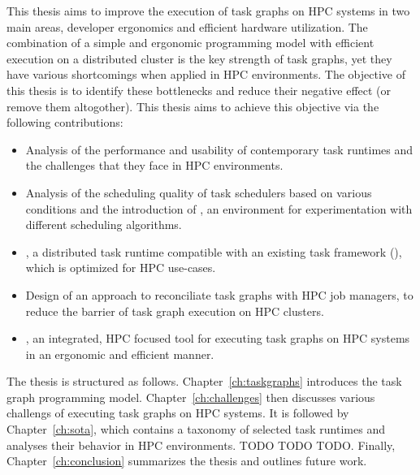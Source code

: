 This thesis aims to improve the execution of task graphs on HPC systems in two main areas,
developer ergonomics and efficient hardware utilization. The combination of a simple and ergonomic
programming model with efficient execution on a distributed cluster is the key strength of task
graphs, yet they have various shortcomings when applied in HPC environments. The objective of this
thesis is to identify these bottlenecks and reduce their negative effect (or remove them
altogother). This thesis aims to achieve this objective via the following contributions:
\begin{itemize}
	\item Analysis of the performance and usability of contemporary task runtimes and the challenges that
	      they face in HPC environments.
	\item Analysis of the scheduling quality of task schedulers based on various conditions and the
	      introduction of \estee{}, an environment for experimentation with different scheduling
	      algorithms.
	\item \rsds{}, a distributed task runtime compatible with an existing task framework
	      (\dask{}), which is optimized for HPC use-cases.
	\item Design of an approach to reconciliate task graphs with HPC job managers, to reduce the barrier of
	      task graph execution on HPC clusters.
	\item \hyperqueue{}, an integrated, HPC focused tool for executing task graphs on HPC systems
	      in an ergonomic and efficient manner.
\end{itemize}

The thesis is structured as follows. Chapter~\ref{ch:taskgraphs} introduces the task graph
programming model. Chapter~\ref{ch:challenges} then discusses various challengs of executing
task graphs on HPC systems. It is followed by Chapter~\ref{ch:sota}, which contains a
taxonomy of selected task runtimes and analyses their behavior in HPC environments. TODO TODO TODO.
Finally, Chapter~\ref{ch:conclusion} summarizes the thesis and outlines future work.
